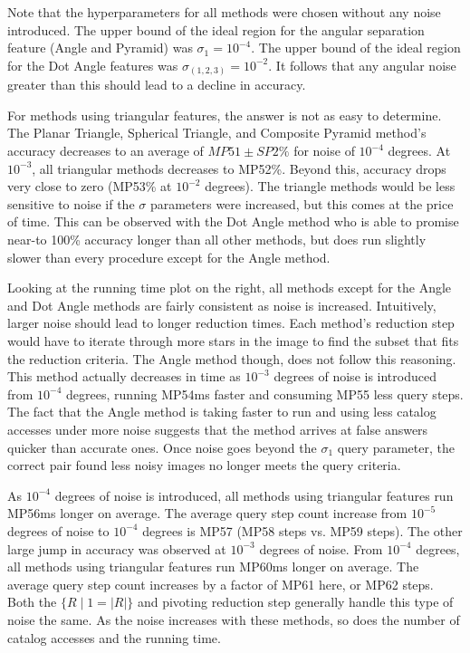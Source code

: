 Note that the hyperparameters for all methods were chosen without any noise introduced.
The upper bound of the ideal region for the angular separation feature (Angle and Pyramid) was $\sigma_1 = 10^{-4}$.
The upper bound of the ideal region for the Dot Angle features was $\sigma_{(1, 2, 3)} = 10^{-2}$.
It follows that any angular noise greater than this should lead to a decline in accuracy.

For methods using triangular features, the answer is not as easy to determine.
The Planar Triangle, Spherical Triangle, and Composite Pyramid method's accuracy decreases to an average of
$MP51 \pm SP2\%$ for noise of $10^{-4}$ degrees.
At $10^{-3}$, all triangular methods decreases to MP52\%.
Beyond this, accuracy drops very close to zero (MP53\% at $10^{-2}$ degrees).
The triangle methods would be less sensitive to noise if the $\sigma$ parameters were increased, but this comes at the
price of time.
This can be observed with the Dot Angle method who is able to promise near-to 100\% accuracy longer than all other
methods, but does run slightly slower than every procedure except for the Angle method.

Looking at the running time plot on the right, all methods except for the Angle and Dot Angle methods are fairly
consistent as noise is increased.
Intuitively, larger noise should lead to longer reduction times.
Each method's reduction step would have to iterate through more stars in the image to find the subset that fits the
reduction criteria.
The Angle method though, does not follow this reasoning.
This method actually decreases in time as $10^{-3}$ degrees of noise is introduced from $10^{-4}$ degrees, running
MP54ms faster and consuming MP55 less query steps.
The fact that the Angle method is taking faster to run and using less catalog accesses under more noise suggests that
the method arrives at false answers quicker than accurate ones.
Once noise goes beyond the $\sigma_1$ query parameter, the correct pair found less noisy images no longer meets the
query criteria.

As $10^{-4}$ degrees of noise is introduced, all methods using triangular features run MP56ms longer on average.
The average query step count increase from $10^{-5}$ degrees of noise to $10^{-4}$ degrees is MP57 (MP58 steps vs.
MP59 steps).
The other large jump in accuracy was observed at $10^{-3}$ degrees of noise.
From $10^{-4}$ degrees, all methods using triangular features run MP60ms longer on average.
The average query step count increases by a factor of MP61 here, or MP62 steps.
Both the $\{ R \mid 1 = |R| \}$ and pivoting reduction step generally handle this type of noise the same.
As the noise increases with these methods, so does the number of catalog accesses and the running time.

